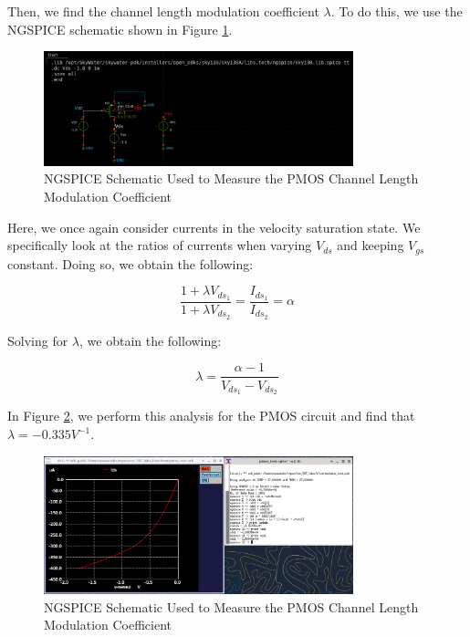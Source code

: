 \documentclass[fleqn]{article}
\begin{document}
	Then, we find the channel length modulation coefficient $\lambda$. To do this, we use the NGSPICE schematic shown in Figure \ref{fig::pmos_lambda_meas_schem}.
	
	\begin{figure}[H]
		\centerline{\includegraphics[width=0.8\textwidth]{pmos_lambda_meas_schem.png}}
		\caption{NGSPICE Schematic Used to Measure the PMOS Channel Length Modulation Coefficient}
		\label{fig::pmos_lambda_meas_schem}
	\end{figure}
	
	\noindent Here, we once again consider currents in the velocity saturation state. We specifically look at the ratios of currents when varying $V_{ds}$ and keeping $V_{gs}$ constant. Doing so, we obtain the following:
	
	\begin{equation}
		\frac{1 + {\lambda}V_{ds_1}}{1 + {\lambda}V_{ds_2}} = \frac{I_{ds_1}}{I_{ds_2}} = \alpha
	\end{equation}
	
	\noindent Solving for $\lambda$, we obtain the following:
	
	\begin{equation}
		\lambda = \frac{\alpha - 1}{V_{ds_1} - V_{ds_2}}
	\end{equation}
	
	\noindent In Figure \ref{fig::pmos_lambda_meas}, we perform this analysis for the PMOS circuit and find that $\lambda = -0.335 V^{-1}$.
	
	\begin{figure}[H]
		\centerline{\includegraphics[width=0.8\textwidth]{pmos_lambda_meas.png}}
		\caption{NGSPICE Schematic Used to Measure the PMOS Channel Length Modulation Coefficient}
		\label{fig::pmos_lambda_meas}
	\end{figure}
	
\end{document}
